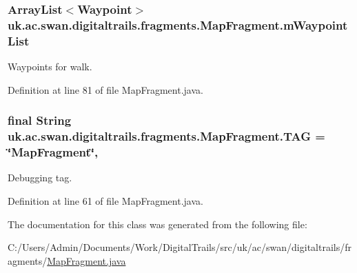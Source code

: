 \hypertarget{classuk_1_1ac_1_1swan_1_1digitaltrails_1_1fragments_1_1_map_fragment_a6c44ef7f0370cc0a699c1cbe80f8c30e}{
\subsubsection[{m\+Waypoint\+List}]{\setlength{\rightskip}{0pt plus 5cm}Array\+List$<${\bf Waypoint}$>$ uk.\+ac.\+swan.\+digitaltrails.\+fragments.\+Map\+Fragment.\+m\+Waypoint\+List\hspace{0.3cm}{\ttfamily [protected]}}}\label{classuk_1_1ac_1_1swan_1_1digitaltrails_1_1fragments_1_1_map_fragment_a6c44ef7f0370cc0a699c1cbe80f8c30e}


Waypoints for walk. 



Definition at line 81 of file Map\+Fragment.\+java.

\hypertarget{classuk_1_1ac_1_1swan_1_1digitaltrails_1_1fragments_1_1_map_fragment_ac5b7b42692d2662bfb1b02f3a9dfb797}{
\subsubsection[{T\+A\+G}]{\setlength{\rightskip}{0pt plus 5cm}final String uk.\+ac.\+swan.\+digitaltrails.\+fragments.\+Map\+Fragment.\+T\+A\+G = \char`\"{}Map\+Fragment\char`\"{}\hspace{0.3cm}{\ttfamily [static]}, {\ttfamily [private]}}}\label{classuk_1_1ac_1_1swan_1_1digitaltrails_1_1fragments_1_1_map_fragment_ac5b7b42692d2662bfb1b02f3a9dfb797}


Debugging tag. 



Definition at line 61 of file Map\+Fragment.\+java.



The documentation for this class was generated from the following file\+:\begin{DoxyCompactItemize}
\item 
C\+:/\+Users/\+Admin/\+Documents/\+Work/\+Digital\+Trails/src/uk/ac/swan/digitaltrails/fragments/\hyperlink{_map_fragment_8java}{Map\+Fragment.\+java}\end{DoxyCompactItemize}
